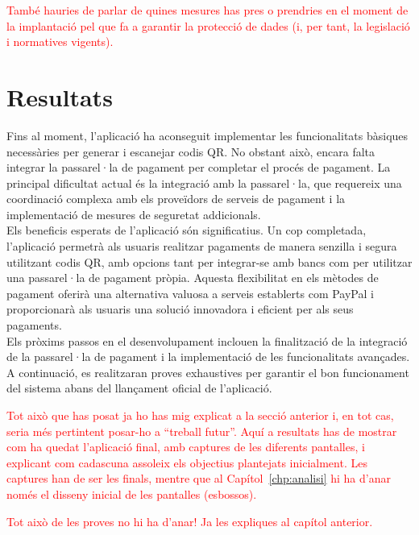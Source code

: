 \documentclass[a4paper,12pt,twoside]{ThesisStyle}
\newcommand{\pau}[1]{\textcolor{red}{#1}}
\begin{document}
\pau{També hauries de parlar de quines mesures has pres o prendries en el moment de la implantació pel que fa a garantir la protecció de dades (i, per tant, la legislació i normatives vigents).}


\section{Resultats}
\label{sec: Resultats}

Fins al moment, l'aplicació ha aconseguit implementar les funcionalitats bàsiques necessàries per generar i escanejar codis QR. No obstant això, encara falta integrar la passarel·la de pagament per completar el procés de pagament. La principal dificultat actual és la integració amb la passarel·la, que requereix una coordinació complexa amb els proveïdors de serveis de pagament i la implementació de mesures de seguretat addicionals.\\

Els beneficis esperats de l'aplicació són significatius. Un cop completada, l'aplicació permetrà als usuaris realitzar pagaments de manera senzilla i segura utilitzant codis QR, amb opcions tant per integrar-se amb bancs com per utilitzar una passarel·la de pagament pròpia. Aquesta flexibilitat en els mètodes de pagament oferirà una alternativa valuosa a serveis establerts com PayPal i proporcionarà als usuaris una solució innovadora i eficient per als seus pagaments.\\

Els pròxims passos en el desenvolupament inclouen la finalització de la integració de la passarel·la de pagament i la implementació de les funcionalitats avançades. A continuació, es realitzaran proves exhaustives per garantir el bon funcionament del sistema abans del llançament oficial de l'aplicació.

\pau{Tot això que has posat ja ho has mig explicat a la secció anterior i, en tot cas, seria més pertintent posar-ho a ``treball futur''. Aquí a resultats has de mostrar com ha quedat l'aplicació final, amb captures de les diferents pantalles, i explicant com cadascuna assoleix els objectius plantejats inicialment. Les captures han de ser les finals, mentre que al Capítol~\ref{chp:analisi} hi ha d'anar només el disseny inicial de les pantalles (esbossos).}

\pau{Tot això de les proves no hi ha d'anar! Ja les expliques al capítol anterior.}
\end{document}
